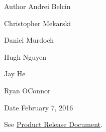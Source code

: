 \begin{DoxyAuthor}{Author}
Andrei Belcin 

Christopher Mekarski 

Daniel Murdoch 

Hugh Nguyen 

Jay He 

Ryan O\textquotesingle{}Connor\textquotesingle{} 
\end{DoxyAuthor}
\begin{DoxyDate}{Date}
February 7, 2016
\end{DoxyDate}
See \hyperlink{product_release_main_page}{Product Release Document}. 

 